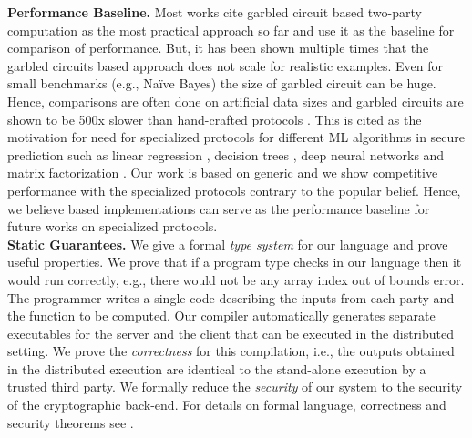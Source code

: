 \noindent\textbf{Performance Baseline.} Most works cite garbled circuit based two-party computation as the most practical approach so far and use it as the baseline for comparison of performance. But, it has been shown multiple times that the garbled circuits based approach does not scale for realistic examples. Even for small benchmarks (e.g., Na\"{i}ve Bayes) the size of garbled circuit can be huge. Hence, comparisons are often done on artificial data sizes and garbled circuits are shown to be 500x slower than hand-crafted protocols \cite{shafindss}. This is cited as the motivation for need for specialized protocols for different ML algorithms in secure prediction such as linear regression \cite{shafindss}, decision trees \cite{wu}, deep neural networks \cite{minionn} and matrix factorization \cite{valeriaMatrix}. Our work is based on generic \mpc and we show competitive performance with the specialized protocols contrary to the popular belief. Hence, we believe \tool based implementations can serve as the performance baseline for future works on specialized protocols. \\



\noindent\textbf{Static Guarantees.} We give a formal {\em type system} for our language and prove useful properties. We prove that if a program type checks in our language then it would run correctly, e.g., there would not be any array index out of bounds error. The programmer writes a single code describing the inputs from each party and the function to be computed. Our compiler automatically generates separate executables for the server and the client that can be executed in the distributed setting. We prove the {\em correctness} for this compilation, i.e., the outputs obtained in the distributed execution are identical to the stand-alone execution by a trusted third party. We formally reduce the {\em security} of our system to the security of the cryptographic back-end. For details on formal language, correctness and security theorems see . \\


